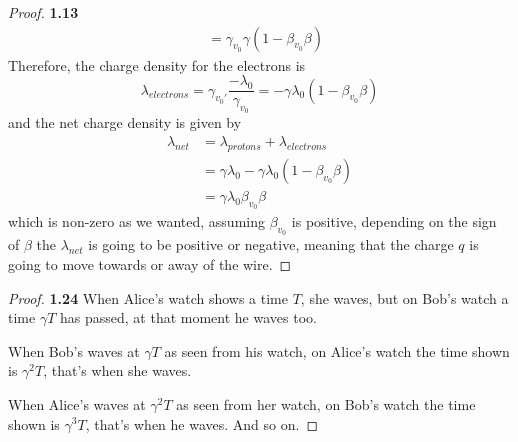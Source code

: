 \documentclass[11pt]{article}
\theoremstyle{definition}
\begin{document}
\begin{proof}{\textbf{1.13}}
\begin{align*}
                &= \gamma_{v_0}\gamma(1-\beta_{v_0}\beta)
        \end{align*}
        Therefore, the charge density for the electrons is
        $$\lambda_{electrons} = \gamma_{v_0'}\frac{-\lambda_0}{\gamma_{v_0}} =
        -\gamma\lambda_0(1-\beta_{v_0}\beta)$$
        and the net charge density is given by
        \begin{align*}
            \lambda_{net} &= \lambda_{protons} + \lambda_{electrons}\\
                &= \gamma\lambda_0 - \gamma\lambda_0(1-\beta_{v_0}\beta)\\
                &= \gamma\lambda_0\beta_{v_0}\beta
        \end{align*}
        which is non-zero as we wanted, assuming $\beta_{v_0}$ is positive,
        depending on the sign of $\beta$ the $\lambda_{net}$ is going to be
        positive or negative, meaning that the charge $q$ is going to move
        towards or away of the wire.
    \end{proof}
	\begin{proof}{\textbf{1.24}}
        When Alice's watch shows a time $T$, she waves, but on Bob's watch a
        time $\gamma T$ has passed, at that moment he waves too.

        When Bob's waves at $\gamma T$ as seen from his watch, on Alice's watch
        the time shown is $\gamma^2 T$, that's when she waves.

        When Alice's waves at $\gamma^2 T$ as seen from her watch, on Bob's
        watch the time shown is $\gamma^3 T$, that's when he waves.
        And so on.
    \end{proof}
\end{document}
